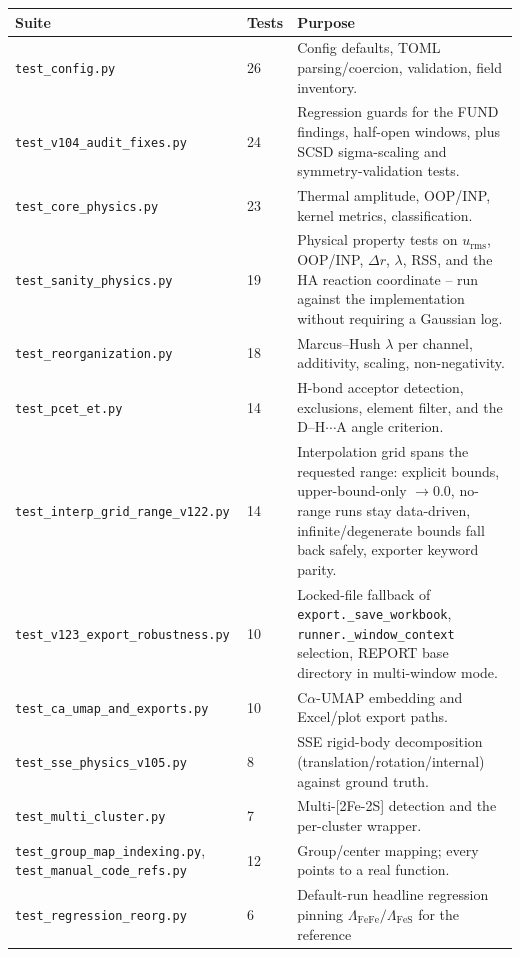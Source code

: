\documentclass[10pt,a4paper,twoside]{article}
\newcommand{\urms}{u_{\mathrm{rms}}}
\newcommand{\codref}[1]{%
  \quad\text{\textcolor{gray!70!black}{\footnotesize $\rightsquigarrow$~\texttt{#1}}}}
\newcommand{\fn}[1]{\texttt{#1}}
\begin{document}
\begin{longtable}{p{} p{} p{}}
\toprule
\textbf{Suite} & \textbf{Tests} & \textbf{Purpose} \\
\midrule
\fn{test\_config.py} & 26 & Config defaults, TOML parsing/coercion,
    validation, field inventory. \\
\fn{test\_v104\_audit\_fixes.py} & 24
  & Regression guards for the FUND findings, half-open windows,
    plus SCSD sigma-scaling and symmetry-validation tests. \\
\fn{test\_core\_physics.py} & 23 & Thermal amplitude, OOP/INP,
    kernel metrics, classification. \\
\fn{test\_sanity\_physics.py} & 19
  & Physical property tests on $\urms$, OOP/INP, $\Delta r$,
    $\lambda$, RSS, and the HA reaction coordinate -- run against the
    implementation without requiring a Gaussian log. \\
\fn{test\_reorganization.py} & 18 & Marcus--Hush $\lambda$ per channel,
    additivity, scaling, non-negativity. \\
\fn{test\_pcet\_et.py} & 14 & H-bond acceptor detection, exclusions,
    element filter, and the D--H$\cdots$A angle criterion. \\
\fn{test\_interp\_grid\_range\_v122.py} & 14 & Interpolation grid spans
    the requested range: explicit bounds, upper-bound-only $\to 0.0$,
    no-range runs stay data-driven, infinite/degenerate bounds fall back
    safely, exporter keyword parity. \\
\fn{test\_v123\_export\_robustness.py} & 10 & Locked-file fallback of
    \fn{export.\_save\_workbook}, \fn{runner.\_window\_context}
    selection, REPORT base directory in multi-window mode. \\
\fn{test\_ca\_umap\_and\_exports.py} & 10 & C$\alpha$-UMAP embedding and
    Excel/plot export paths. \\
\fn{test\_sse\_physics\_v105.py} & 8 & SSE rigid-body decomposition
    (translation/rotation/internal) against ground truth. \\
\fn{test\_multi\_cluster.py} & 7 & Multi-[2Fe-2S] detection and the
    per-cluster wrapper. \\
\fn{test\_group\_map\_indexing.py}, \fn{test\_manual\_code\_refs.py}
  & 12 & Group/center mapping; every \codref{} points to a real function. \\
\fn{test\_regression\_reorg.py} & 6 & Default-run headline regression
    pinning $\Lambda_\text{FeFe}/\Lambda_\text{FeS}$ for the reference

\end{longtable}
\end{document}
